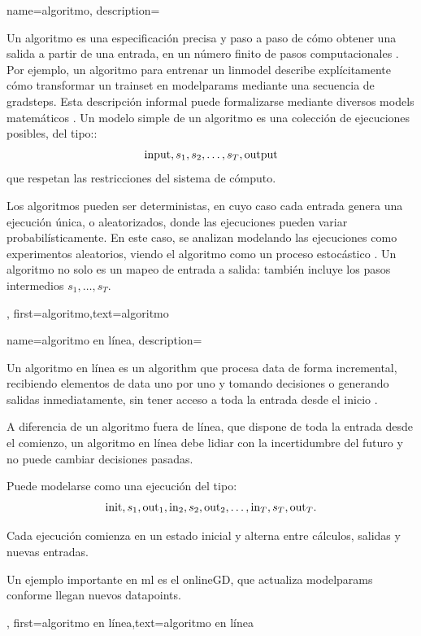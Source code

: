 {{
{name={algoritmo},
  description={Un algoritmo es una especificación precisa y paso a paso de cómo obtener
    una salida a partir de una entrada, en un número finito de pasos computacionales \cite{Cormen:2022aa}. 
    Por ejemplo, un algoritmo para entrenar un \gls{linmodel} describe explícitamente cómo transformar un \gls{trainset} 
	en \gls{modelparams} mediante una secuencia de \gls{gradstep}s. 
    Esta descripción informal puede formalizarse mediante diversos \gls{model}s matemáticos \cite{Sipser2013}. 
    Un modelo simple de un algoritmo es una colección de ejecuciones posibles, del tipo::
    $${\rm input},s_1,s_2,\ldots,s_T,{\rm output}$$ 
    que respetan las restricciones del sistema de cómputo.

	Los algoritmos pueden ser deterministas, en cuyo caso cada entrada genera una ejecución única, o aleatorizados, 
	donde las ejecuciones pueden variar probabilísticamente. En este caso, se analizan modelando las ejecuciones
	como experimentos aleatorios, viendo el algoritmo como un proceso estocástico \cite{RandomizedAlgos,BertsekasProb,Gallager13}.
	Un algoritmo no solo es un mapeo de entrada a salida: también incluye los pasos intermedios $s_1,\ldots,s_T$.
	},
	first={algoritmo},text={algoritmo} 
}

{
	name=algoritmo en línea,
	description={
		Un algoritmo en línea es un \gls{algorithm} que procesa \gls{data} de forma incremental,
		recibiendo elementos de \gls{data} uno por uno y tomando decisiones o generando salidas inmediatamente, sin tener acceso a toda la entrada desde el inicio \cite{HazanOCO,PredictionLearningGames}.

		A diferencia de un algoritmo fuera de línea, que dispone de toda la entrada desde el comienzo, un algoritmo en línea debe lidiar con la incertidumbre del futuro y no puede cambiar decisiones pasadas.

		Puede modelarse como una ejecución del tipo:
		$${\rm init},s_1,{\rm out}_{1},{\rm in}_{2},s_2,{\rm out}_{2},\ldots,{\rm in}_{T},s_T,{\rm out}_{T}.$$

		Cada ejecución comienza en un estado inicial y alterna entre cálculos, salidas y nuevas entradas.

		Un ejemplo importante en \gls{ml} es el \gls{onlineGD}, que actualiza \gls{modelparams} conforme llegan nuevos \gls{datapoint}s.
	},
	first={algoritmo en línea},text={algoritmo en línea}
}



}}
